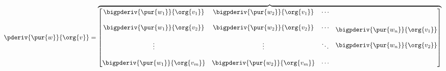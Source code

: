 \begin{definition}
                \begin{equation*}
                    \pderiv{ \pur{w} }{ \org{v} } 
                    =
                    \overbrace{
                        \begin{bmatrix}
                            \begin{matrix}
                                \bigpderiv{ \pur{w_1} }   { \org{v_1} }\\ 
                                \\
                                \bigpderiv{ \pur{w_1} }   { \org{v_2} }\\ 
                                \\
                                \vdots \\ 
                                \\
                                \bigpderiv{ \pur{w_1} }   { \org{v_m} }
                            \end{matrix} &
                            \begin{matrix}
                                \bigpderiv{ \pur{w_2} }   { \org{v_1} }\\ 
                                \\
                                \bigpderiv{ \pur{w_2} }   { \org{v_2} }\\ 
                                \\
                                \vdots \\ 
                                \\
                                \bigpderiv{ \pur{w_2} }   { \org{v_m} }
                            \end{matrix} &
                            \begin{matrix}
                                \cdots\\\\ \cdots \\\\ \ddots \\\\ \cdots
                            \end{matrix} &
                            \begin{matrix}
                                \bigpderiv{ \pur{w_n} }   { \org{v_1} }\\ 
                                \\
                                \bigpderiv{ \pur{w_n} }   { \org{v_2} }\\ 

\end{matrix}
\end{bmatrix}}
\end{equation*}
\end{definition}

